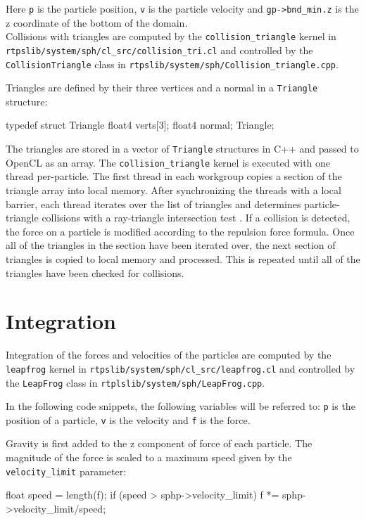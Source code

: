 Here \verb|p| is the particle position, \verb|v| is the particle velocity and
\verb|gp->bnd_min.z| is the z coordinate of the bottom of the domain.
\\

Collisions with triangles are computed by the \verb|collision_triangle| kernel in
\\ \verb|rtpslib/system/sph/cl_src/collision_tri.cl| and controlled by the
\verb|CollisionTriangle| class in \verb|rtpslib/system/sph/Collision_triangle.cpp|.

Triangles are defined by their three vertices and a normal in a \verb|Triangle| structure:
\begin{cppcode}{0}
typedef struct Triangle
{
    float4 verts[3];
    float4 normal;
} Triangle;
\end{cppcode}

The triangles are stored in a vector of \verb|Triangle| structures in C++ and
passed to OpenCL as an array. The \verb|collision_triangle| kernel is executed
with one thread per-particle. The first thread in each workgroup copies a section of the
triangle array into local memory. After synchronizing the threads with a local
barrier, each thread iterates over the list of triangles and determines
particle-triangle collisions with a ray-triangle intersection
test \cite{Ericson}. If a collision is detected, the force on a particle is
modified according to the repulsion force formula. Once all of the triangles in
the section have been iterated over, the next section of triangles is copied to
local memory and processed. This is repeated until all of the
triangles have been checked for collisions.


\section{Integration}

Integration of the forces and velocities of the particles are computed by the
\verb|leapfrog| kernel in \verb|rtpslib/system/sph/cl_src/leapfrog.cl| and
controlled by the \verb|LeapFrog| class in
\verb|rtplslib/system/sph/LeapFrog.cpp|.

In the following code snippets, the following variables will be referred to:
\verb|p| is the position of a particle, \verb|v| is the velocity and \verb|f| is the force.


Gravity is first added to the z component of force of each particle. The
magnitude of the force is scaled to a maximum speed given by the \verb|velocity_limit| parameter:
\begin{cppcode}{0}
float speed = length(f);
if (speed > sphp->velocity_limit) 
{
    f *= sphp->velocity_limit/speed;
}
\end{cppcode}

